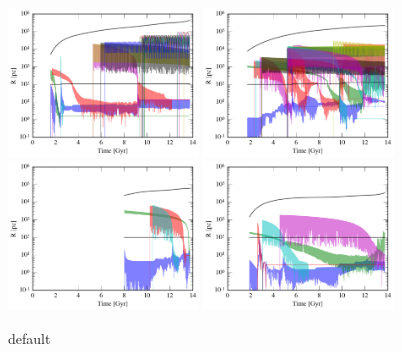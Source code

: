\documentclass[english, apj]{emulateapj}
\begin{document}
\begin{figure}[htbp]
\begin{center}
\includegraphics[width=0.45\textwidth]{plots/radius_A.png}
\includegraphics[width=0.45\textwidth]{plots/radius_B.png}\\
\includegraphics[width=0.45\textwidth]{plots/radius_C.png}
\includegraphics[width=0.45\textwidth]{plots/radius_D.png}\\
\caption{default}
\label{default2}
\end{center}
\end{figure}
\end{document}
